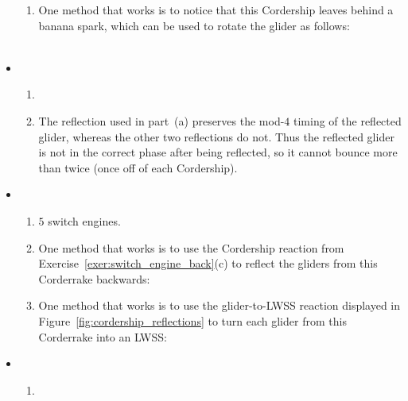 \begin{multicols}{2}
\begin{itemize}[leftmargin=0em]
\begin{enumerate}[leftmargin=1.5em,label=\bf\color{ocre}(\alph*)]
			\item One method that works is to notice that this Cordership leaves behind a banana spark, which can be used to rotate the glider as follows: \\[-0.6em]
			
			 \\
		\end{enumerate}
	

		\item[\bf\color{ocre}\sffamily\ref{exer:2_engine_cordership}]
		\begin{enumerate}[leftmargin=1.5em,label=\bf\color{ocre}(\alph*)]
			\item {} \\
			
			\item The reflection used in part~(a) preserves the mod-$4$ timing of the reflected glider, whereas the other two reflections do not. Thus the reflected glider is not in the correct phase after being reflected, so it cannot bounce more than twice (once off of each Cordership). \\
		\end{enumerate}
		
		
		\item[\bf\color{ocre}\sffamily\ref{exer:corderrake}]
		\begin{enumerate}[leftmargin=1.5em,label=\bf\color{ocre}(\alph*)]
			\item $5$ switch engines.
			
			\item One method that works is to use the Cordership reaction from Exercise~\ref{exer:switch_engine_back}(c) to reflect the gliders from this Corderrake backwards: \\[-0.6em]
			
			
			\item One method that works is to use the glider-to-LWSS reaction displayed in Figure~\ref{fig:cordership_reflections} to turn each glider from this Corderrake into an LWSS: \\[-0.6em]
			
		\end{enumerate}
		
		
		\item[\bf\color{ocre}\sffamily\ref{exer:six_cell_schick}]
		\begin{enumerate}[leftmargin=1.5em,label=\bf\color{ocre}(\alph*)]
			\item {} \\
			

\end{enumerate}
\end{itemize}
\end{multicols}
